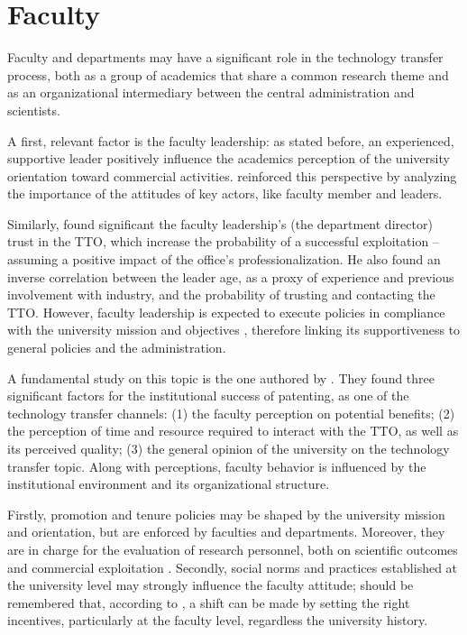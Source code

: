 \section{Faculty}

Faculty and departments may have a significant role in the technology transfer process, both as a group of academics that share a common research theme and as an organizational intermediary between the central administration and scientists. 

A first, relevant factor is the faculty leadership: as stated before, an experienced, supportive leader positively influence the academics perception of the university orientation toward commercial activities. \citet{Guerrero2014} reinforced this perspective by analyzing the importance of the attitudes of key actors, like faculty member and leaders. 

Similarly, \citet{Muscio2010} found significant the faculty leadership's (the department director) trust in the TTO, which increase the probability of a successful exploitation – assuming a positive impact of the office's professionalization. He also found an inverse correlation between the leader age, as a proxy of experience and previous involvement with industry, and the probability of trusting and contacting the TTO. However, faculty leadership is expected to execute policies in compliance with the university mission and objectives \citep{Chang2016}, therefore linking its supportiveness to general policies and the administration. 

A fundamental study on this topic is the one authored by \citet{OwenSmith2001}. They found three significant factors for the institutional success of patenting, as one of the technology transfer channels: (1) the faculty perception on potential benefits; (2) the perception of time and resource required to interact with the TTO, as well as its perceived quality; (3) the general opinion of the university on the technology transfer topic. Along with perceptions, faculty behavior is influenced by the institutional environment and its organizational structure. 

Firstly, promotion and tenure policies may be shaped by the university mission and orientation, but are enforced by faculties and departments. Moreover, they are in charge for the evaluation of research personnel, both on scientific outcomes and commercial exploitation \citep{Chang2016}. Secondly, social norms and practices established at the university level may strongly influence the faculty attitude; should be remembered that, according to \citet{Bercovitz2006}, a shift can be made by setting the right incentives, particularly at the faculty level, regardless the university history.

